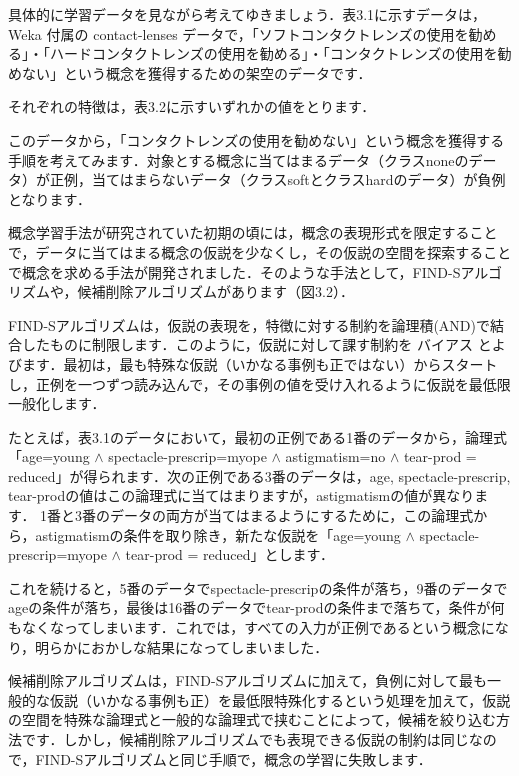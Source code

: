 具体的に学習データを見ながら考えてゆきましょう．表3.1に示すデータは，Weka 付属の contact-lenses データで，「ソフトコンタクトレンズの使用を勧める」・「ハードコンタクトレンズの使用を勧める」・「コンタクトレンズの使用を勧めない」という概念を獲得するための架空のデータです．

それぞれの特徴は，表3.2に示すいずれかの値をとります．

このデータから，「コンタクトレンズの使用を勧めない」という概念を獲得する手順を考えてみます．対象とする概念に当てはまるデータ（クラスnoneのデータ）が正例，当てはまらないデータ（クラスsoftとクラスhardのデータ）が負例となります．


概念学習手法が研究されていた初期の頃には，概念の表現形式を限定することで，データに当てはまる概念の仮説を少なくし，その仮説の空間を探索することで概念を求める手法が開発されました．そのような手法として，FIND-Sアルゴリズムや，候補削除アルゴリズムがあります（図3.2）．

FIND-Sアルゴリズムは，仮説の表現を，特徴に対する制約を論理積(AND)で結合したものに制限します．このように，仮説に対して課す制約を
バイアス
とよびます．最初は，最も特殊な仮説（いかなる事例も正ではない）からスタートし，正例を一つずつ読み込んで，その事例の値を受け入れるように仮説を最低限一般化します．

たとえば，表3.1のデータにおいて，最初の正例である1番のデータから，論理式「age=young $\wedge$ spectacle-prescrip=myope $\wedge$ astigmatism=no $\wedge$  tear-prod = reduced」が得られます．次の正例である3番のデータは，age, spectacle-prescrip, tear-prodの値はこの論理式に当てはまりますが，astigmatismの値が異なります．
1番と3番のデータの両方が当てはまるようにするために，この論理式から，astigmatismの条件を取り除き，新たな仮説を「age=young $\wedge$ spectacle-prescrip=myope $\wedge$ tear-prod = reduced」とします．

これを続けると，5番のデータでspectacle-prescripの条件が落ち，9番のデータでageの条件が落ち，最後は16番のデータでtear-prodの条件まで落ちて，条件が何もなくなってしまいます．これでは，すべての入力が正例であるという概念になり，明らかにおかしな結果になってしまいました．


候補削除アルゴリズムは，FIND-Sアルゴリズムに加えて，負例に対して最も一般的な仮説（いかなる事例も正）を最低限特殊化するという処理を加えて，仮説の空間を特殊な論理式と一般的な論理式で挟むことによって，候補を絞り込む方法です．しかし，候補削除アルゴリズムでも表現できる仮説の制約は同じなので，FIND-Sアルゴリズムと同じ手順で，概念の学習に失敗します．

